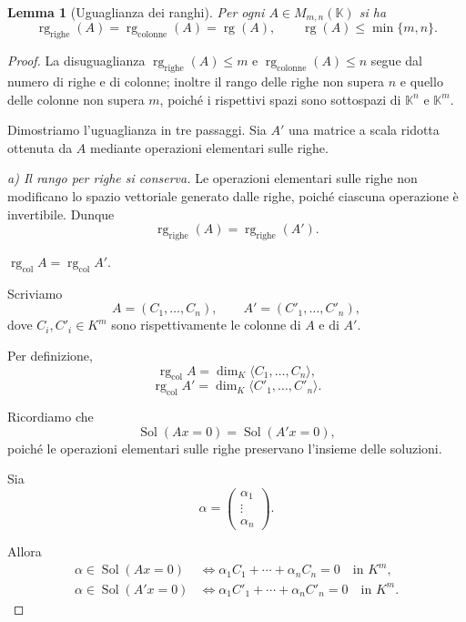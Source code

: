 \documentclass[11pt,a4paper]{article}
\newcommand{\KK}{\mathbb{K}}
\theoremstyle{plain}
\newtheorem{lemma}[prop]{Lemma}
\theoremstyle{definition}
\theoremstyle{remark}
\begin{document}
\begin{lemma}[Uguaglianza dei ranghi]
Per ogni $A\in M_{m,n}(\KK)$ si ha
\[
 \operatorname{rg}_{\mathrm{righe}}(A)
 =\operatorname{rg}_{\mathrm{colonne}}(A)
 =\operatorname{rg}(A),
 \qquad \operatorname{rg}(A)\leq\min\{m,n\}.
\]
\end{lemma}

\begin{proof}
La disuguaglianza $\operatorname{rg}_{\mathrm{righe}}(A)\leq m$ e $\operatorname{rg}_{\mathrm{colonne}}(A)\leq n$ segue dal numero di righe e di colonne; inoltre il rango delle righe non supera $n$ e quello delle colonne non supera $m$, poich\'e i rispettivi spazi sono sottospazi di $\KK^n$ e $\KK^m$.

Dimostriamo l'uguaglianza in tre passaggi. Sia $A'$ una matrice a scala ridotta ottenuta da $A$ mediante operazioni elementari sulle righe.

\noindent\emph{a) Il rango per righe si conserva.}
Le operazioni elementari sulle righe non modificano lo spazio vettoriale generato dalle righe, poich\'e ciascuna operazione \`e invertibile. Dunque
\[
 \operatorname{rg}_{\mathrm{righe}}(A)
 =\operatorname{rg}_{\mathrm{righe}}(A').
\]

\item[b)] $\operatorname{rg}_{\mathrm{col}} A
=\operatorname{rg}_{\mathrm{col}} A'$.

Scriviamo
\[
A=(C_1,\ldots,C_n),
\qquad
A'=(C'_1,\ldots,C'_n),
\]
dove $C_i,C'_i\in K^m$ sono rispettivamente
le colonne di $A$ e di $A'$.

Per definizione,
\[
\operatorname{rg}_{\mathrm{col}} A
=\dim_K\langle C_1,\ldots,C_n\rangle,
\]
\[
\operatorname{rg}_{\mathrm{col}} A'
=\dim_K\langle C'_1,\ldots,C'_n\rangle.
\]

Ricordiamo che
\[
\operatorname{Sol}(Ax=0)
=\operatorname{Sol}(A'x=0),
\]
poiché le operazioni elementari sulle righe
preservano l'insieme delle soluzioni.

Sia
\[
\alpha=
\begin{pmatrix}
\alpha_1\\
\vdots\\
\alpha_n
\end{pmatrix}.
\]

Allora
\[
\begin{aligned}
\alpha\in\operatorname{Sol}(Ax=0)
&\iff
\alpha_1C_1+\cdots+\alpha_nC_n=0
\quad\text{in }K^m,\\
\alpha\in\operatorname{Sol}(A'x=0)
&\iff
\alpha_1C'_1+\cdots+\alpha_nC'_n=0
\quad\text{in }K^m.
\end{aligned}
\]


\end{proof}
\end{document}
